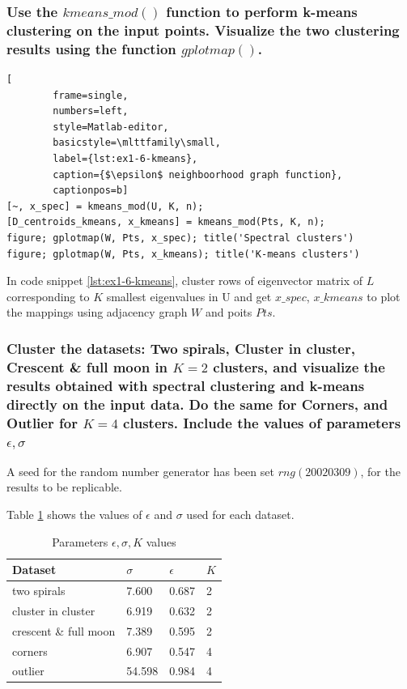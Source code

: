 \documentclass[unicode,11pt,a4paper,oneside,numbers=endperiod,openany]{scrartcl}
\begin{document}
\subsubsection{
    Use the $kmeans\_mod()$ function to perform k-means clustering on the input points.
    Visualize the two clustering results using the function $gplotmap()$.}

\begin{lstlisting}[
        frame=single,
        numbers=left,
        style=Matlab-editor,
        basicstyle=\mlttfamily\small,
        label={lst:ex1-6-kmeans},
        caption={$\epsilon$ neighboorhood graph function},
        captionpos=b]
[~, x_spec] = kmeans_mod(U, K, n);
[D_centroids_kmeans, x_kmeans] = kmeans_mod(Pts, K, n);
figure; gplotmap(W, Pts, x_spec); title('Spectral clusters')
figure; gplotmap(W, Pts, x_kmeans); title('K-means clusters')
\end{lstlisting}

In code snippet \ref{lst:ex1-6-kmeans}, cluster rows of eigenvector matrix of $L$
corresponding to $K$ smallest eigenvalues in U and get $x\_spec$, $x\_kmeans$ to plot the mappings using
adjacency graph $W$ and poits $Pts$.

\subsubsection{Cluster the datasets: Two spirals, Cluster in cluster, Crescent \& full moon in $K = 2$ clusters,
    and visualize the results obtained with spectral clustering and k-means directly on the input data.
    Do the same for Corners, and Outlier for $K = 4$ clusters.
    Include the values of parameters $\epsilon, \sigma$}

A seed for the random number generator has been set $rng(20020309)$, for the results to be replicable.

Table \ref{table:ex1-7-coefficients} shows the values of $\epsilon$ and $\sigma$ used for each dataset.

\begin{table}[H]
    \centering
    \caption{Parameters $\epsilon, \sigma, K$ values}
    \label{table:ex1-7-coefficients}
    \begin{tabular}{||l l l l||}
        \hline
        Dataset               & $\sigma$ & $\epsilon$ & $K$ \\ [0.5ex]
        \hline\hline
        two spirals           & 7.600    & 0.687      & 2   \\
        cluster in cluster    & 6.919    & 0.632      & 2   \\
        crescent \& full moon & 7.389    & 0.595      & 2   \\
        corners               & 6.907    & 0.547      & 4   \\
        outlier               & 54.598   & 0.984      & 4   \\ [1ex]
        \hline
    \end{tabular}
\end{table}
\end{document}
